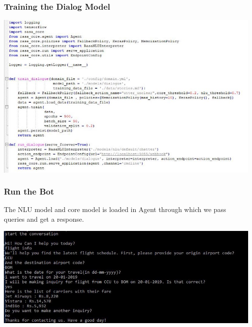  \begin{frame}[fragile]\frametitle{Training the Dialog Model}


\begin{center}
\includegraphics[width=\linewidth,keepaspectratio]{images/mmt8}
\end{center}

\end{frame}

 \begin{frame}[fragile]\frametitle{Run the Bot}

The NLU model and core model is loaded in Agent through which we pass queries and get a response.

\begin{center}
\includegraphics[width=\linewidth,keepaspectratio]{images/mmt9}
\end{center}

\end{frame}


